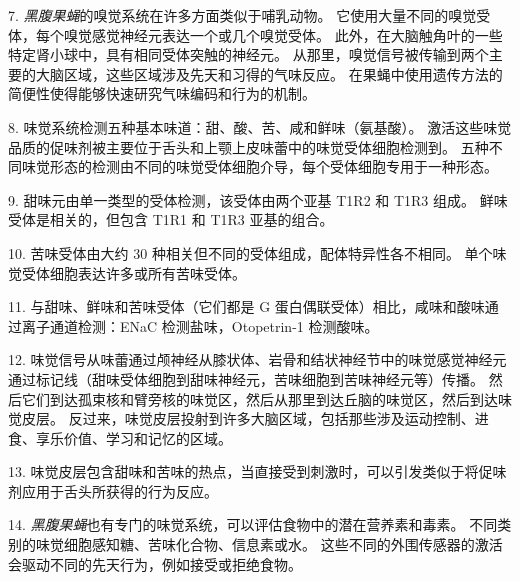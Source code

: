 7. \textit{黑腹果蝇}的嗅觉系统在许多方面类似于哺乳动物。
它使用大量不同的嗅觉受体，每个嗅觉感觉神经元表达一个或几个嗅觉受体。
此外，在大脑触角叶的一些特定肾小球中，具有相同受体突触的神经元。
从那里，嗅觉信号被传输到两个主要的大脑区域，这些区域涉及先天和习得的气味反应。
在果蝇中使用遗传方法的简便性使得能够快速研究气味编码和行为的机制。


8. 味觉系统检测五种基本味道：甜、酸、苦、咸和鲜味（氨基酸）。
激活这些味觉品质的促味剂被主要位于舌头和上颚上皮味蕾中的味觉受体细胞检测到。
五种不同味觉形态的检测由不同的味觉受体细胞介导，每个受体细胞专用于一种形态。


9. 甜味元由单一类型的受体检测，该受体由两个亚基 T1R2 和 T1R3 组成。
鲜味受体是相关的，但包含 T1R1 和 T1R3 亚基的组合。


10. 苦味受体由大约 30 种相关但不同的受体组成，配体特异性各不相同。
单个味觉受体细胞表达许多或所有苦味受体。 


11. 与甜味、鲜味和苦味受体（它们都是 G 蛋白偶联受体）相比，咸味和酸味通过离子通道检测：ENaC 检测盐味，Otopetrin-1 检测酸味。 


12. 味觉信号从味蕾通过颅神经从膝状体、岩骨和结状神经节中的味觉感觉神经元通过标记线（甜味受体细胞到甜味神经元，苦味细胞到苦味神经元等）传播。
然后它们到达孤束核和臂旁核的味觉区，然后从那里到达丘脑的味觉区，然后到达味觉皮层。
反过来，味觉皮层投射到许多大脑区域，包括那些涉及运动控制、进食、享乐价值、学习和记忆的区域。


13. 味觉皮层包含甜味和苦味的热点，当直接受到刺激时，可以引发类似于将促味剂应用于舌头所获得的行为反应。 


14. \textit{黑腹果蝇}也有专门的味觉系统，可以评估食物中的潜在营养素和毒素。
不同类别的味觉细胞感知糖、苦味化合物、信息素或水。 
这些不同的外围传感器的激活会驱动不同的先天行为，例如接受或拒绝食物。


